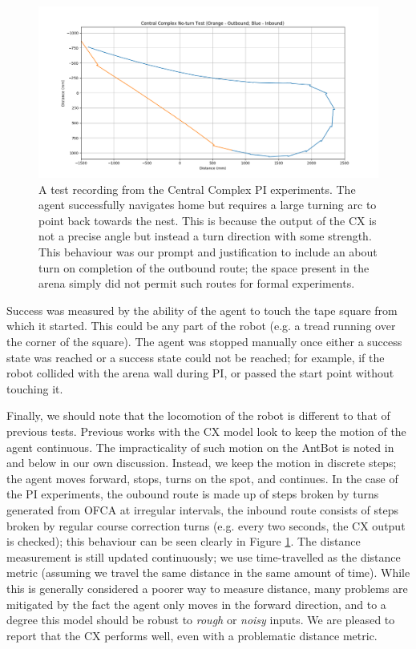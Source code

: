 \documentclass[a4paper,11pt,twoside,openright]{article}
\begin{document}
\begin{figure}[h!]
  \centering
  \includegraphics[width=\textwidth]{CXNT}
  \caption{\label{fig:cxnt} A test recording from the Central Complex
    PI experiments. The agent successfully navigates home but requires a large
    turning arc to point back towards the nest. This is because the output of the
    CX is not a precise angle but instead a turn direction with some strength.
    This behaviour was our prompt and justification to include an about turn on
    completion of the outbound route; the space present in the arena simply did
    not permit such routes for formal experiments.
  }
\end{figure}

Success was measured by the ability of the agent to touch the tape
square from which it started. This could be any part of the robot
(e.g. a tread running over the corner of the square). The agent was
stopped manually once either a success state was reached or a success
state could not be reached; for example, if the robot collided with
the arena wall during PI, or passed the start point without touching it.
\newline\par

Finally,  we should note that the locomotion of the robot is different to that of
previous tests. Previous works with the CX model look to keep the motion of the
agent continuous. The impracticality of such motion on the AntBot is noted in
\cite{Mitchell2018} and below in our own discussion. Instead, we keep the motion
in discrete steps; the agent moves forward, stops, turns on the spot, and
continues. In the case of the PI experiments, the oubound route is made up of
steps broken by turns generated from OFCA at irregular intervals, the inbound
route consists of steps broken by regular course correction turns (e.g. every two
seconds, the CX output is checked); this behaviour can be seen 
clearly in Figure \ref{fig:cxnt}. The distance measurement is still updated
continuously; we use time-travelled as the distance metric (assuming we
travel the same distance in the same amount of time). While this is generally
considered a poorer way to measure distance, many problems are mitigated by the
fact the agent only moves in the forward direction, and to a degree this model
should be robust to \textit{rough} or \textit{noisy} inputs. We are pleased to
report that the CX performs well, even with a problematic distance metric.
\end{document}
